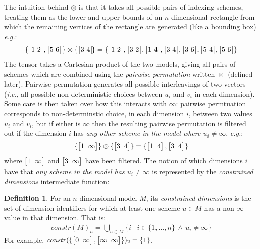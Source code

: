 \documentclass[9pt]{sigplanconf}
\newcounter{block}
\theoremstyle{definition}
\newtheorem{definition}[block]{Definition}
\newcommand{\ie}{\emph{i.e.}}
\newcommand{\eg}{\emph{e.g.}}
\newcommand{\vtwohs}[2]{\setlength{\arraycolsep}{0em}
\left[\begin{array}{cc}#1 \, & \, #2\end{array}\right]\!}
\newcommand{\vtwoh}[2]{\setlength{\arraycolsep}{0em}
\left[\begin{array}{cc}#1 \; & \; #2\end{array}\right]}
\newcommand{\effdims}[2]{\mathit{constr}(#1)_{#2}}
\begin{document}
The intuition behind $\otimes$ is that it takes
all possible pairs of indexing schemes, treating them as the
lower and upper bounds of an $n$-dimensional rectangle from which the
remaining vertices of the rectangle are generated (like a bounding
box) \eg{}:
\begin{align*}
\{\vtwohs{1}{2}, \vtwohs{5}{6}\,\} \otimes \{\vtwohs{3}{4}\} =
\{\vtwohs{1}{2}, \vtwohs{3}{2}, \vtwohs{1}{4}, \vtwohs{3}{4}, 
   \vtwohs{3}{6}, \vtwohs{5}{4}, \vtwohs{5}{6}\,\}
\end{align*}
The tensor takes a Cartesian product of the two models,
giving all pairs of schemes which are combined using the
\emph{pairwise permutation} written $\bowtie$ (defined later).
Pairwise permutation generates all possible interleavings of two vectors
(\ie{}, all possible non-deterministic choices between $u_i$ and
$v_i$ in each dimension). Some care is then taken over
how this interacts with $\infty$: pairwise permtuation
corresponds to non-determinstic choice, in each dimension $i$,
between two values $u_i$ and $v_i$, but if either
is $\infty$ then the resulting pairwise permutation is
filtered out if the dimension $i$ has \emph{any other scheme
in the model where $u_i \neq \infty$}, \eg{}:
\begin{align*}
\{\vtwoh{1}{\infty}\} \otimes \{\vtwoh{3}{4}\} =
\{\vtwoh{1}{4}, \vtwoh{3}{4}\}
\end{align*}
%
where $\vtwoh{1}{\infty}$ and $\vtwoh{3}{\infty}$ have been filtered.
%
%
%
The notion of which dimensions $i$ have that \emph{any scheme in the model
has $u_i \neq \infty$} is represented by the \emph{constrained
dimensions} intermediate function:
%
\begin{definition}%
For an $n$-dimensional model $M$, its \emph{constrained dimensions}
is the set of dimension identifiers for which at least one scheme $u \in M$ has
a non-$\infty$ value in that dimension. That is:
%
\begin{align*}
\effdims{M}{n} =
\bigcup_{u \in M} \{i \mid i \in \{1,\ldots,n\} \, \wedge \, u_i \neq
  \infty\}
\end{align*}
For example, $\effdims{\{\vtwoh{0}{\infty},\vtwoh{\infty}{\infty}\}}{2}
 = \{1\}$.
\end{definition}
\end{document}
